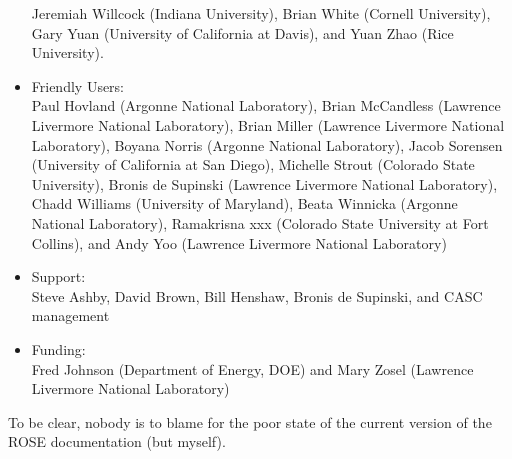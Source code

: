 \begin{itemize}
           Jeremiah Willcock (Indiana University),
           Brian White (Cornell University),
           Gary Yuan (University of California at Davis), and
           Yuan Zhao (Rice University).
     \item Friendly Users: \\
           Paul Hovland (Argonne National Laboratory),
           Brian McCandless (Lawrence Livermore National Laboratory),
           Brian Miller (Lawrence Livermore National Laboratory),
           Boyana Norris (Argonne National Laboratory),
           Jacob Sorensen (University of California at San Diego),
           Michelle Strout (Colorado State University),
           Bronis de Supinski (Lawrence Livermore National Laboratory),
           Chadd Williams (University of Maryland),
           Beata Winnicka (Argonne National Laboratory),
           Ramakrisna xxx (Colorado State University at Fort Collins), and
           Andy Yoo (Lawrence Livermore National Laboratory)
     \item Support: \\
           Steve Ashby,
           David Brown,
           Bill Henshaw,
           Bronis de Supinski, and
           CASC management
     \item Funding: \\
           Fred Johnson (Department of Energy, DOE) and
           Mary Zosel (Lawrence Livermore National Laboratory)
\end{itemize}


To be clear, nobody is to blame for the poor state of the current version of the 
ROSE documentation (but myself).






